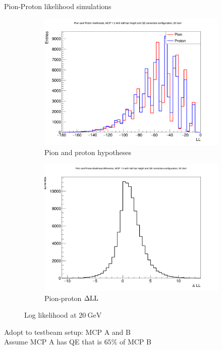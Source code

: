 \documentclass{beamer}
\begin{document}
\begin{frame}{Pion-Proton likelihood simulations}
  \begin{figure}
    \centering
    \vspace{-0.2cm}
    \begin{subfigure}{0.5\textwidth}
      \includegraphics[width = 1.0\textwidth]{Plots/ProtonPionLL20GeVStandardMCPAB.png}
      \caption{Pion and proton hypotheses}
    \end{subfigure}%
    \begin{subfigure}{0.5\textwidth}
      \includegraphics[width = 1.0\textwidth]{Plots/ProtonPionDLL20GeVStandardMCPAB.png}
      \caption{Pion-proton $\Delta{\rm LL}$}
    \end{subfigure}
    \caption{Log likelihood at $\SI{20}{\giga\eV}$}
  \end{figure}
  \begin{center}
    Adopt to testbeam setup: MCP A and B\\
    Assume MCP A has QE that is $65\%$ of MCP B
  \end{center}
\end{frame}
\end{document}
